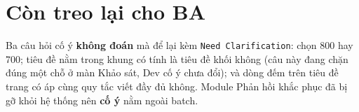\section{Còn treo lại cho BA}

Ba câu hỏi cố ý \textbf{không đoán} mà để lại kèm \texttt{Need Clarification}: chọn 800 hay
700; tiêu đề nằm trong khung có tính là tiêu đề khối không (câu này đang chặn đúng một chỗ ở
màn Khảo sát, Dev cố ý chưa đổi); và dòng đếm trên tiêu đề trang có áp cùng quy tắc viết đầy
đủ không. Module Phản hồi khắc phục đã bị gỡ khỏi hệ thống nên \textbf{cố ý} nằm ngoài batch.
